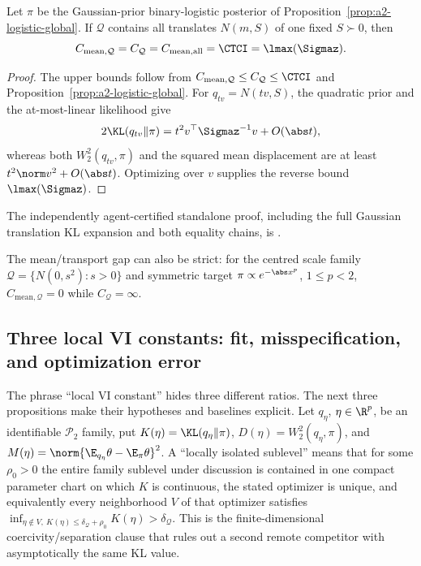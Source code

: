 \documentclass[../../main.tex]{subfiles}
\begin{document}
\begin{proposition}
\label{prop:a4-logistic-global}
Let $\pi$ be the Gaussian-prior binary-logistic posterior of
Proposition~\ref{prop:a2-logistic-global}. If $\mathcal Q$ contains all translates
$N(m,S)$ of one fixed $S\succ0$, then
\[
 C_{\mathrm{mean},\mathcal Q}=C_{\mathcal Q}
 =C_{\mathrm{mean},\mathrm{all}}=\CTCI=\lmax(\Sigmaz).
\]
\end{proposition}

\begin{proof}
The upper bounds follow from $C_{\mathrm{mean},\mathcal Q}\le C_{\mathcal Q}\le\CTCI$ and
Proposition~\ref{prop:a2-logistic-global}. For $q_{tv}=N(tv,S)$, the quadratic prior and the
at-most-linear likelihood give
\[
 2\KL(q_{tv}\|\pi)=t^2v^\top\Sigmaz^{-1}v+O(\abs t),
\]
whereas both $W_2^2(q_{tv},\pi)$ and the squared mean displacement are at least
$t^2\norm v^2+O(\abs t)$. Optimizing over $v$ supplies the reverse bound
$\lmax(\Sigmaz)$.
\end{proof}

\noindent The independently agent-certified standalone proof, including the full Gaussian
translation KL expansion and both equality chains, is
.

The mean/transport gap can also be strict: for the centred scale family
$\mathcal Q=\{N(0,s^2):s>0\}$ and symmetric target $\pi\propto e^{-\abs x^p}$, $1\le p<2$,
$C_{\mathrm{mean},\mathcal Q}=0$ while $C_{\mathcal Q}=\infty$.

\subsection{Three local VI constants: fit, misspecification, and optimization error}
\label{subsec:a4-local-three}

The phrase ``local VI constant'' hides three different ratios. The next three propositions make
their hypotheses and baselines explicit. Let $q_\eta$, $\eta\in\R^p$, be an identifiable
$\mathcal P_2$ family, put $K(\eta)=\KL(q_\eta\|\pi)$,
$D(\eta)=W_2^2(q_\eta,\pi)$, and
$M(\eta)=\norm{\E_{q_\eta}\theta-\E_\pi\theta}^2$. A ``locally isolated sublevel'' means that
for some $\rho_0>0$ the entire family sublevel under discussion is contained in one compact
parameter chart on which $K$ is continuous, the stated optimizer is unique, and equivalently
every neighborhood $V$ of that optimizer satisfies
$\inf_{\eta\notin V,\ K(\eta)\le\delta_{\mathcal Q}+\rho_0}K(\eta)>\delta_{\mathcal Q}$.
This is the finite-dimensional coercivity/separation clause that rules out a second remote
competitor with asymptotically the same KL value.
\end{document}
